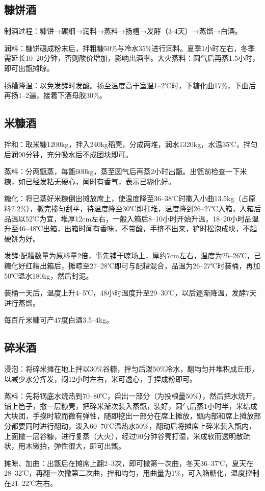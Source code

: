 \documentclass{ctexbook}
\begin{document}
\subsection{糠饼酒}
制酒过程：糠饼→碾细→润料→蒸料→扬槽→发酵（3-4天）→蒸馏→白酒。

润料：糠饼碾成粉末后，拌粗糠50\%与冷水35\%进行润料。夏季1小时左右，冬季需延长10--20分钟，否则酸价增加，影响出酒率。大火蒸料：圆气后再蒸1.5小时，即可出甑摊晾。

扬糟降温：以免发酵时发酸。扬至温度高于室温1--2℃时，下糖化曲17\%，下曲后再扬1--2遍，接着下酒母胶30\%。
\subsection{米糠酒}
拌和：取米糠1200kg，拌入240kg稻壳，分成两堆，润水1320kg，水温35℃，拌匀后润90分钟，充分吸水后不成团块即可。

蒸料：分两甑蒸，每甑600kg，蒸至圆气后再蒸2小时出甑。出甑前检查一下米糠，如已经发粘无硬心，闻时有香气，表示已糊化好。

糖化：将已蒸好米糠倒出摊放席上，使温度降至36--38℃时撒入小曲13.5kg（占原料2.2\%），撒完掺匀刮平，待温度降至30℃即打堆，温度降到26--27℃入箱，入箱后品温以52℃为宜，堆厚12cm左右，一般入箱后8--10小时开始升温，18--20小时品温升至46--48℃出箱，出箱时闻有香味，不带酸，手挤不出来，铲时松泡成块，不起硬饼为好。

发酵:配糟数量为原料量2倍，事先铺于晾场上，厚约7cm左右，温度为25--26℃，已糖化好红糟出箱后，摊晾至27--28℃即可与配糟混合，品温为26--27℃时装桶，再加50℃温水180kg，然后封泥。

装桶一天后，温度上升4--5℃，48小时温度升至29--30℃，以后逐渐降温，发酵7天进行蒸馏。

每百斤米糠可产47度白酒3.5--4kg。
\subsection{碎米酒}
浸泡：将碎米摊在地上拌以30\%谷糠，拌匀后泼50\%冷水，翻均匀并堆积成丘形，以减少水分挥发，闷12小时左右，米可透心，手捏成粉即可。

蒸料：先将锅底水烧热到70--80℃，舀出一部分（为投粮量50\%），然后把水烧开，铺上笆子，撒一层糠壳，把碎米渐次装入蒸甑，装好，圆气后蒸1小时半，米结成大块团，手摸时软而微有弹性，随即挖出一部分在席上摊放，甑内部和席上摊放部分都要同时进行翻动，泼入60--70℃温热水50\%，翻动后将摊席上碎米装入甑内，上面撒一层谷糠，进行复蒸（大火），经过90分钟谷壳打湿，米成软而透明散疏状，用木锹拍，弹性很大，即可出甑。

摊晾、加曲：出甑后在摊席上翻2--3次，即可撒第一次曲，冬天36--37℃，夏天在28--32℃，再翻一次撒第二次曲，拌和均匀，用曲量为1\%，可入箱糖化，温度控制在21--22℃左右。
\end{document}
